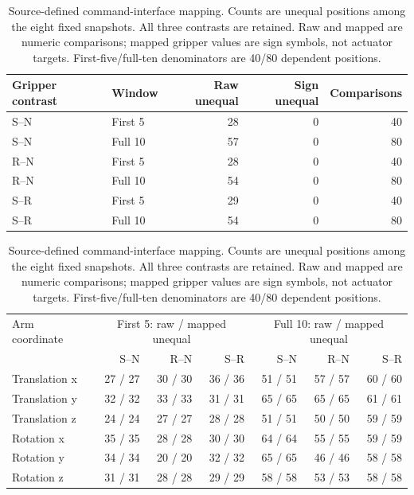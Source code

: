 \begin{table}[!h]
\centering
\caption{Source-defined command-interface mapping. Counts are unequal positions among the eight fixed snapshots. All three contrasts are retained. Raw and mapped are numeric comparisons; mapped gripper values are sign symbols, not actuator targets. First-five/full-ten denominators are 40/80 dependent positions.}
\label{tab:control-map}
\begin{tabular}{@{}llrrr@{}}\toprule
Gripper contrast & Window & Raw unequal & Sign unequal & Comparisons\\\midrule
S--N & First 5 & 28 & 0 & 40\\
S--N & Full 10 & 57 & 0 & 80\\
R--N & First 5 & 28 & 0 & 40\\
R--N & Full 10 & 54 & 0 & 80\\
S--R & First 5 & 29 & 0 & 40\\
S--R & Full 10 & 54 & 0 & 80\\
\bottomrule\end{tabular}
\medskip
\begin{tabular}{@{}lrrrrrr@{}}\toprule
Arm coordinate & \multicolumn{3}{c}{First 5: raw / mapped unequal} & \multicolumn{3}{c}{Full 10: raw / mapped unequal}\\
 & S--N & R--N & S--R & S--N & R--N & S--R\\\midrule
Translation x & 27 / 27 & 30 / 30 & 36 / 36 & 51 / 51 & 57 / 57 & 60 / 60\\
Translation y & 32 / 32 & 33 / 33 & 31 / 31 & 65 / 65 & 65 / 65 & 61 / 61\\
Translation z & 24 / 24 & 27 / 27 & 28 / 28 & 51 / 51 & 50 / 50 & 59 / 59\\
Rotation x & 35 / 35 & 28 / 28 & 30 / 30 & 64 / 64 & 55 / 55 & 59 / 59\\
Rotation y & 34 / 34 & 20 / 20 & 32 / 32 & 65 / 65 & 46 / 46 & 58 / 58\\
Rotation z & 31 / 31 & 28 / 28 & 29 / 29 & 58 / 58 & 53 / 53 & 58 / 58\\
\bottomrule\end{tabular}
\end{table}
